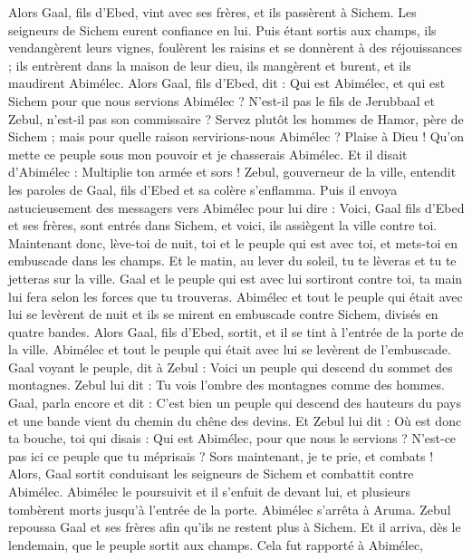 \begin{multicols}{2}
Alors Gaal, fils d'Ebed, vint avec ses frères, et ils passèrent à Sichem. Les seigneurs de Sichem eurent confiance en lui.
Puis étant sortis aux champs, ils vendangèrent leurs vignes, foulèrent les raisins et se donnèrent à des réjouissances ; ils entrèrent dans la maison de leur dieu, ils mangèrent et burent, et ils maudirent Abimélec.
Alors Gaal, fils d'Ebed, dit : Qui est Abimélec, et qui est Sichem pour que nous servions Abimélec ? N'est-il pas le fils de Jerubbaal et Zebul, n'est-il pas son commissaire ? Servez plutôt les hommes de Hamor, père de Sichem ; mais pour quelle raison servirions-nous Abimélec ?
Plaise à Dieu ! Qu'on mette ce peuple sous mon pouvoir et je chasserais Abimélec. Et il disait d'Abimélec : Multiplie ton armée et sors !
Zebul, gouverneur de la ville, entendit les paroles de Gaal, fils d'Ebed et sa colère s'enflamma.
Puis il envoya astucieusement des messagers vers Abimélec pour lui dire : Voici, Gaal fils d'Ebed et ses frères, sont entrés dans Sichem, et voici, ils assiègent la ville contre toi.
Maintenant donc, lève-toi de nuit, toi et le peuple qui est avec toi, et mets-toi en embuscade dans les champs.
Et le matin, au lever du soleil, tu te lèveras et tu te jetteras sur la ville. Gaal et le peuple qui est avec lui sortiront contre toi, ta main lui fera selon les forces que tu trouveras.
Abimélec et tout le peuple qui était avec lui se levèrent de nuit et ils se mirent en embuscade contre Sichem, divisés en quatre bandes.
Alors Gaal, fils d'Ebed, sortit, et il se tint à l'entrée de la porte de la ville. Abimélec et tout le peuple qui était avec lui se levèrent de l'embuscade.
Gaal voyant le peuple, dit à Zebul : Voici un peuple qui descend du sommet des montagnes. Zebul lui dit : Tu vois l'ombre des montagnes comme des hommes.
Gaal, parla encore et dit : C'est bien un peuple qui descend des hauteurs du pays et une bande vient du chemin du chêne des devins.
Et Zebul lui dit : Où est donc ta bouche, toi qui disais : Qui est Abimélec, pour que nous le servions ? N'est-ce pas ici ce peuple que tu méprisais ? Sors maintenant, je te prie, et combats !
Alors, Gaal sortit conduisant les seigneurs de Sichem et combattit contre Abimélec.
Abimélec le poursuivit et il s'enfuit de devant lui, et plusieurs tombèrent morts jusqu'à l'entrée de la porte.
Abimélec s'arrêta à Aruma. Zebul repoussa Gaal et ses frères afin qu'ils ne restent plus à Sichem.
Et il arriva, dès le lendemain, que le peuple sortit aux champs. Cela fut rapporté à Abimélec,

\end{multicols}
